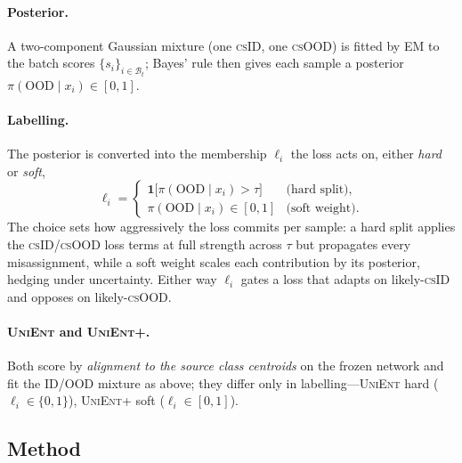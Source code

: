 \documentclass[11pt]{article}
\newcommand{\csid}{\textsc{cs}ID}
\newcommand{\csood}{\textsc{cs}OOD}
\newcommand{\method}[1]{\textsc{#1}}
\newcommand{\Ind}{\mathbf{1}}
\begin{document}
\paragraph{Posterior.} A two-component Gaussian mixture (one \csid, one
\csood) is fitted by EM to the batch scores $\{s_i\}_{i\in\mathcal{B}_t}$;
Bayes' rule then gives each sample a posterior
$\pi(\mathrm{OOD}\mid x_i)\in[0,1]$.

\paragraph{Labelling.} The posterior is converted into the membership
$\ell_i$ the loss acts on, either \emph{hard} or \emph{soft},
\begin{equation}\label{eq:label}
\ell_i=
\begin{cases}
\Ind\!\big[\pi(\mathrm{OOD}\mid x_i)>\tau\big] & \text{(hard split)},\\[3pt]
\pi(\mathrm{OOD}\mid x_i)\in[0,1] & \text{(soft weight)}.
\end{cases}
\end{equation}
The choice sets how aggressively the loss commits per sample: a hard split
applies the \csid/\csood{} loss terms at full strength across $\tau$ but
propagates every misassignment, while a soft weight scales each contribution
by its posterior, hedging under uncertainty. Either way $\ell_i$ gates a loss
that adapts on likely-\csid{} and opposes on likely-\csood.

\paragraph{\method{UniEnt} and \method{UniEnt+}.} Both score by
\emph{alignment to the source class centroids} on the frozen network and fit
the ID/OOD mixture as above; they differ only in labelling---\method{UniEnt}
hard ($\ell_i\in\{0,1\}$), \method{UniEnt+} soft ($\ell_i\in[0,1]$).

\newpage
\subsection{Method}\label{sec:method}
\end{document}
